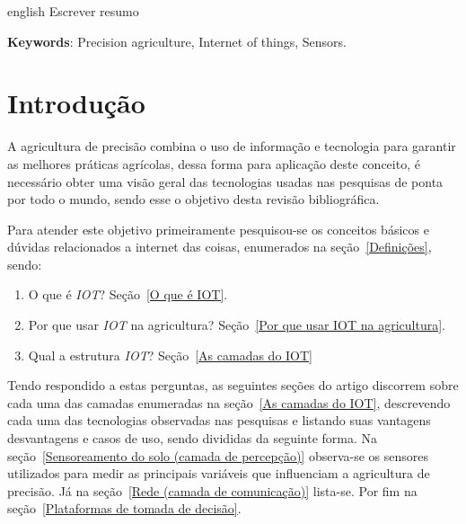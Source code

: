 \documentclass[
article,			%
12pt,				%
oneside,			%
a4paper,			%
english,			%
brazil,				%
sumario=tradicional
]{abntex2}
\begin{document}
\renewcommand{\resumoname}{Abstract}
\begin{resumoumacoluna}
  \begin{otherlanguage*}{english}
    Escrever resumo
    \vspace{\onelineskip}
    \noindent

    \textbf{Keywords}: Precision agriculture, Internet of things, Sensors.
  \end{otherlanguage*}  
\end{resumoumacoluna}


\textual
\section{Introdução}

A agricultura de precisão combina o uso de informação e tecnologia para garantir as melhores práticas agrícolas\cite{9}, dessa forma para aplicação deste conceito, é necessário obter uma visão geral das tecnologias usadas nas pesquisas de ponta por todo o mundo, sendo esse o objetivo desta revisão bibliográfica.

Para atender este objetivo primeiramente pesquisou-se os conceitos básicos e dúvidas relacionados a internet das coisas, enumerados na seção~\ref{Definições}, sendo:
\begin{enumerate}
    \item O que é \textit{IOT}\@? Seção~\ref{O que é IOT}.
    \item Por que usar \textit{IOT} na agricultura? Seção~\ref{Por que usar IOT na agricultura}.
    \item Qual a estrutura \textit{IOT}? Seção~\ref{As camadas do IOT}
\end{enumerate}

Tendo respondido a estas perguntas, as seguintes seções do artigo discorrem sobre cada uma das camadas enumeradas na seção~\ref{As camadas do IOT}, descrevendo cada uma das tecnologias observadas nas pesquisas e listando suas vantagens desvantagens e casos de uso, sendo divididas da seguinte forma.
Na seção~\ref{Sensoreamento do solo (camada de percepção)} observa-se os sensores utilizados para medir as principais variáveis que influenciam a agricultura de precisão.
Já na seção~\ref{Rede (camada de comunicação)} lista-se.
Por fim na seção~\ref{Plataformas de tomada de decisão}.
\end{document}
